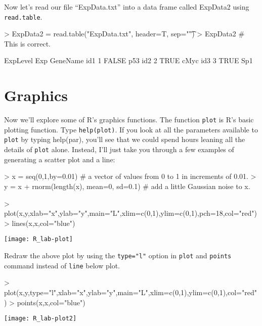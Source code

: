 \documentclass[12pt]{article}
\newcommand{\code}[1]{{\texttt{#1}}}
\begin{document}
Now let's read our file ``ExpData.txt'' into a data frame called ExpData2 using \code{read.table}.

\begin{Schunk}
\begin{Sinput}
> ExpData2 = read.table("ExpData.txt", header=T, sep="\t")
> ExpData2 # This is correct.
\end{Sinput}
\begin{Soutput}
    ExpLevel   Exp GeneName
id1        1 FALSE      p53
id2        2  TRUE     cMyc
id3        3  TRUE      Sp1
\end{Soutput}
\end{Schunk}

\section{Graphics}

Now we'll explore some of R's graphics functions.  The function \code{plot} is R's basic plotting function.  Type \code{help(plot)}.  If you look at all the parameters available to \code{plot} by typing help(par), you'll see that we could spend hours leaning all the details of \code{plot} alone.  Instead, I'll just take you through a few examples of generating a scatter plot and a line:

\begin{Schunk}
\begin{Sinput}
> x = seq(0,1,by=0.01) # a vector of values from 0 to 1 in increments of 0.01.
> y = x + rnorm(length(x), mean=0, sd=0.1) # add a little Gaussian noise to x.
\end{Sinput}
\end{Schunk}

\begin{Schunk}
\begin{Sinput}
> plot(x,y,xlab="x",ylab="y",main="L",xlim=c(0,1),ylim=c(0,1),pch=18,col="red")
> lines(x,x,col="blue")
\end{Sinput}
\end{Schunk}
\texttt{[image: R\_lab-plot]}

Redraw the above plot by using the \code{type="l"} option in \code{plot} and \code{points} command instead of \code{line} below plot.

\begin{Schunk}
\begin{Sinput}
> plot(x,y,type="l",xlab="x",ylab="y",main="L",xlim=c(0,1),ylim=c(0,1),col="red")
> points(x,x,col="blue")
\end{Sinput}
\end{Schunk}
\texttt{[image: R\_lab-plot2]}
\end{document}
